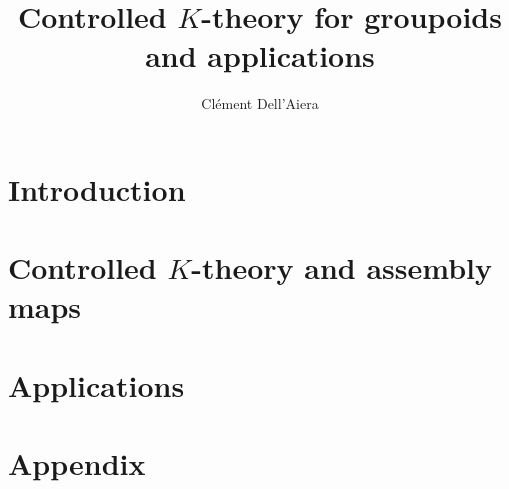 \documentclass[a4paper]{report}
\title{Controlled $K$-theory for groupoids and applications}
\date{}
\author{ Clément Dell'Aiera}
\begin{document}
\maketitle

\newpage
\tableofcontents

\newpage
\newpage


\part{Introduction}




%

\part{Controlled $K$-theory and assembly maps}





\part{Applications}




\newpage
%
%
%

\part{Appendix}






 
\end{document}
